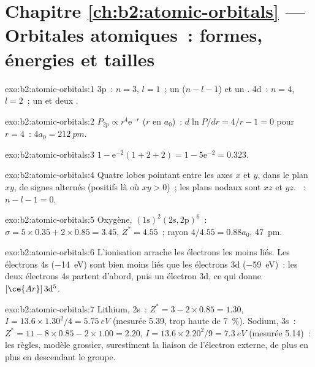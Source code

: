 \section*{Chapitre \ref{ch:b2:atomic-orbitals} --- Orbitales atomiques~: formes, énergies et tailles}

\begin{solution}{exo:b2:atomic-orbitals:1}
3p~: $n = 3$, $l = 1$~; un  ($n - l - 1$) et un . 4d~: $n = 4$,
$l = 2$~; un  et deux .
\end{solution}

\begin{solution}{exo:b2:atomic-orbitals:2}
$P_{2p} \propto r^4\mathrm e^{-r}$ ($r$ en $a_0$)~: $d\ln P/dr = 4/r - 1 = 0$ pour $r = 4$~:
$4a_0 = \qty{212}{pm}$.
\end{solution}

\begin{solution}{exo:b2:atomic-orbitals:3}
$1 - \mathrm e^{-2}(1 + 2 + 2) = 1 - 5\mathrm e^{-2} = 0.323$.
\end{solution}

\begin{solution}{exo:b2:atomic-orbitals:4}
Quatre lobes pointant entre les axes $x$ et $y$, dans le plan $xy$, de signes
alternés (positifs là où $xy > 0$)~; les plans nodaux sont $xz$ et $yz$. ~:
$n - l - 1 = 0$.
\end{solution}

\begin{solution}{exo:b2:atomic-orbitals:5}
Oxygène, $(1\mathrm s)^2(2\mathrm s, 2\mathrm p)^6$~: $\sigma = 5 \times 0.35 + 2 \times 0.85
= 3.45$, $Z^* = 4.55$~; rayon $4/4.55 = 0.88a_0$, \qty{47}{pm}.
\end{solution}

\begin{solution}{exo:b2:atomic-orbitals:6}
L'ionisation arrache les électrons les moins liés. Les électrons 4s
(\qty{-14}{eV}) sont bien moins liés que les électrons 3d (\qty{-59}{eV})~: les deux électrons 4s
partent d'abord, puis un électron 3d, ce qui donne $[\ce{Ar}]\,3\mathrm d^5$.
\end{solution}

\begin{solution}{exo:b2:atomic-orbitals:7}
Lithium, 2s~: $Z^* = 3 - 2 \times 0.85 = 1.30$, $I = 13.6 \times 1.30^2/4 =
\qty{5.75}{eV}$ (mesurée 5.39, trop haute de 7~\%). Sodium, 3s~: $Z^* = 11 - 8 \times 0.85 -
2 \times 1.00 = 2.20$, $I = 13.6 \times 2.20^2/9 = \qty{7.3}{eV}$ (mesurée 5.14)~: les
règles, modèle grossier, surestiment la liaison de l'électron externe, de plus en
plus en descendant le groupe.
\end{solution}

